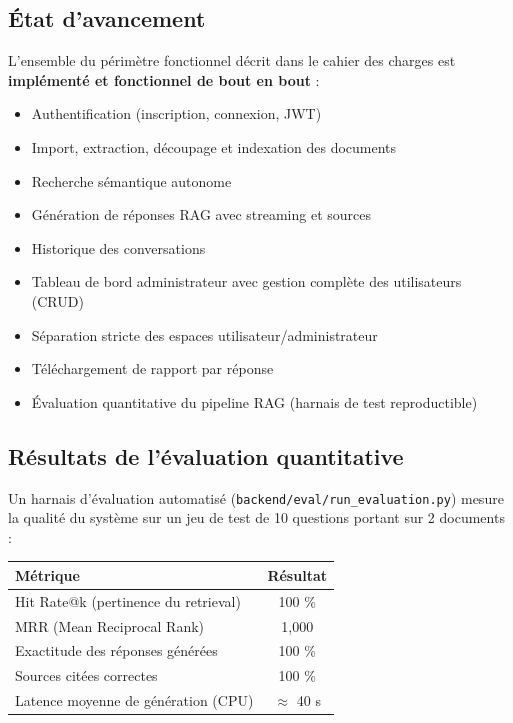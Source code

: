\documentclass[12pt,a4paper]{article}
\begin{document}
\subsection{État d'avancement}
L'ensemble du périmètre fonctionnel décrit dans le cahier des charges est \textbf{implémenté et fonctionnel de bout en bout} :

\begin{itemize}[label=\checkmark]
  \item Authentification (inscription, connexion, JWT)
  \item Import, extraction, découpage et indexation des documents
  \item Recherche sémantique autonome
  \item Génération de réponses RAG avec streaming et sources
  \item Historique des conversations
  \item Tableau de bord administrateur avec gestion complète des utilisateurs (CRUD)
  \item Séparation stricte des espaces utilisateur/administrateur
  \item Téléchargement de rapport par réponse
  \item Évaluation quantitative du pipeline RAG (harnais de test reproductible)
\end{itemize}

\subsection{Résultats de l'évaluation quantitative}
Un harnais d'évaluation automatisé (\texttt{backend/eval/run\_evaluation.py}) mesure la qualité du système sur un jeu de test de 10 questions portant sur 2 documents :

\begin{table}[h]
\centering
\begin{tabular}{|l|c|}
\hline
\textbf{Métrique} & \textbf{Résultat} \\
\hline
Hit Rate@k (pertinence du retrieval) & 100 \% \\
MRR (Mean Reciprocal Rank) & 1,000 \\
Exactitude des réponses générées & 100 \% \\
Sources citées correctes & 100 \% \\
Latence moyenne de génération (CPU) & $\approx$ 40 s \\
\hline
\end{tabular}
\end{table}
\end{document}
